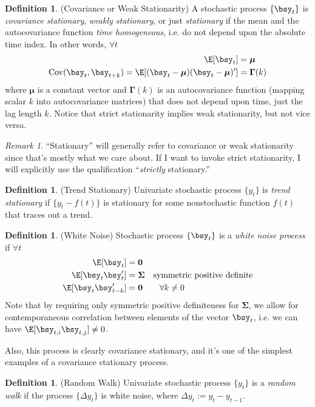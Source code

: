 \documentclass[12pt]{article}
\theoremstyle{plain}
\theoremstyle{definition}
\newtheorem{defn}[thm]{Definition}
\theoremstyle{remark}
\newtheorem*{rmk}{Remark}
\newcommand{\bsmu}{\boldsymbol{\mu}}
\newcommand{\bsSigma}{\boldsymbol{\Sigma}}
\newcommand{\bsGamma}{\boldsymbol{\Gamma}}
\renewcommand{\bso}{\boldsymbol{0}}
\newcommand{\Cov}{\operatorname{Cov}}
\begin{document}
\begin{defn}(Covariance or Weak Stationarity)
A stochastic process $\{\bsy_t\}$ is \emph{covariance stationary},
\emph{weakly stationary}, or just \emph{stationary} if the mean and the
autocovariance function \emph{time homogeneous}, i.e. do not depend upon
the absolute time index.
In other words, $\forall t$
\begin{align*}
  \E[\bsy_t] &= \bsmu \\
  \Cov(\bsy_t,\bsy_{t+k}) =
  \E[(\bsy_t-\bsmu)(\bsy_t-\bsmu)']
  &= \bsGamma(k)
\end{align*}
where $\bsmu$ is a constant vector and $\bsGamma(k)$ is an
autocovariance function (mapping scalar $k$ into autocovariance
matrices) that does not depend upon time, just the lag length $k$.
Notice that strict stationarity implies weak stationarity, but not vice
versa.
\end{defn}
\begin{rmk}
``Stationary'' will generally refer to covariance or weak stationarity
since that's mostly what we care about. If I want to invoke strict
stationarity, I will explicitly use the qualification ``\emph{strictly}
stationary.''
\end{rmk}

\begin{defn}(Trend Stationary)
Univariate stochastic process $\{y_t\}$ is \emph{trend stationary} if
$\{y_t-f(t)\}$ is stationary for some nonstochastic function $f(t)$ that
traces out a trend.
\end{defn}


\begin{defn}(White Noise)
Stochastic process $\{\bsy_t\}$ is a \emph{white noise process}
if $\forall t$
\begin{align*}
  \E[\bsy_t] &= \bso
  \\
  \E[\bsy_t\bsy_t'] &= \bsSigma
  \quad\text{symmetric positive definite}
  \\
  \E[\bsy_t\bsy_{t-k}']
  &= \bso \qquad \forall k\neq 0
\end{align*}
Note that by requiring only symmetric positive definiteness for
$\bsSigma$, we allow for contemporaneous correlation between elements of
the vector $\bsy_t$, i.e. we can have $\E[\bsy_{t,i}\bsy_{t,j}]\neq 0$.

Also, this process is clearly covariance stationary, and it's one of the
simplest examples of a covariance stationary process.
\end{defn}

\begin{defn}(Random Walk)
Univariate stochastic process $\{y_t\}$ is a \emph{random walk} if the
process $\{\Delta y_t\}$ is white noise, where
$\Delta y_t := y_t-y_{t-1}$.
\end{defn}
\end{document}
